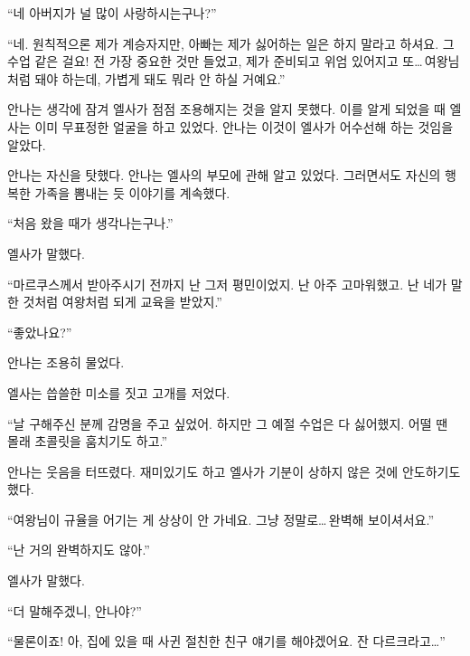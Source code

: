 ``네 아버지가 널 많이 사랑하시는구나?''

``네. 원칙적으론 제가 계승자지만, 아빠는 제가 싫어하는 일은 하지 말라고 하셔요. 그 수업 같은 걸요! 전 가장 중요한 것만 들었고, 제가 준비되고 위엄 있어지고 또\ldots\,여왕님처럼 돼야 하는데, 가볍게 돼도 뭐라 안 하실 거예요.''

안나는 생각에 잠겨 엘사가 점점 조용해지는 것을 알지 못했다. 이를 알게 되었을 때 엘사는 이미 무표정한 얼굴을 하고 있었다. 안나는 이것이 엘사가 어수선해 하는 것임을 알았다.

안나는 자신을 탓했다. 안나는 엘사의 부모에 관해 알고 있었다. 그러면서도 자신의 행복한 가족을 뽐내는 듯 이야기를 계속했다.

`` 처음 왔을 때가 생각나는구나.''

엘사가 말했다.

``마르쿠스께서 받아주시기 전까지 난 그저 평민이었지. 난 아주 고마워했고. 난 네가 말한 것처럼 여왕처럼 되게 교육을 받았지.''

``좋았나요?''

안나는 조용히 물었다.

엘사는 씁쓸한 미소를 짓고 고개를 저었다.

``날 구해주신 분께 감명을 주고 싶었어. 하지만 그 예절 수업은 다 싫어했지. 어떨 땐 몰래 초콜릿을 훔치기도 하고.''

안나는 웃음을 터뜨렸다. 재미있기도 하고 엘사가 기분이 상하지 않은 것에 안도하기도 했다.

``여왕님이 규율을 어기는 게 상상이 안 가네요. 그냥 정말로\ldots\,완벽해 보이셔서요.''

``난 거의 완벽하지도 않아.''

엘사가 말했다.

``더 말해주겠니, 안나야?''

``물론이죠! 아, 집에 있을 때 사귄 절친한 친구 얘기를 해야겠어요. 잔 다르크라고\ldots''

